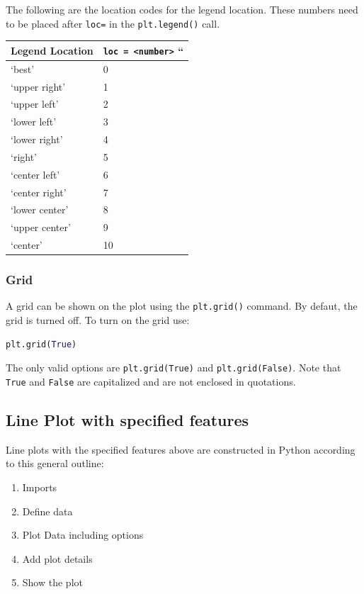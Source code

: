 \documentclass{book}
\providecommand{\tightlist}{%
      \setlength{\itemsep}{0pt}\setlength{\parskip}{0pt}}
\begin{document}
The following are the location codes for the legend location. These
numbers need to be placed after \lstinline!loc=! in the
\lstinline!plt.legend()! call.

\begin{longtable}[]{@{}ll@{}}
\toprule
Legend Location & \lstinline!loc = <number>! ``\tabularnewline
\midrule
\endhead
`best' & 0\tabularnewline
`upper right' & 1\tabularnewline
`upper left' & 2\tabularnewline
`lower left' & 3\tabularnewline
`lower right' & 4\tabularnewline
`right' & 5\tabularnewline
`center left' & 6\tabularnewline
`center right' & 7\tabularnewline
`lower center' & 8\tabularnewline
`upper center' & 9\tabularnewline
`center' & 10\tabularnewline
\bottomrule
\end{longtable}
    




    
        \subsubsection{Grid}\label{grid}

A grid can be shown on the plot using the \lstinline!plt.grid()!
command. By defaut, the grid is turned off. To turn on the grid use:

\begin{lstlisting}[language=Python]
plt.grid(True)
\end{lstlisting}

The only valid options are \lstinline!plt.grid(True)! and
\lstinline!plt.grid(False)!. Note that \lstinline!True! and
\lstinline!False! are capitalized and are not enclosed in quotations.
    




    
        \subsection{Line Plot with specified
features}\label{line-plot-with-specified-features}
    




    
        Line plots with the specified features above are constructed in Python
according to this general outline:

\begin{enumerate}
\def\labelenumi{\arabic{enumi}.}
\tightlist
\item
  Imports
\item
  Define data
\item
  Plot Data including options
\item
  Add plot details
\item
  Show the plot
\end{enumerate}
\end{document}
